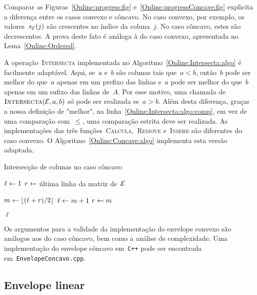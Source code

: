 Comparar as Figuras~\ref{Online:progress:fig} e~\ref{Online:progressConcave:fig} explicita a diferença entre os casos convexo e côncavo. No caso convexo, por exemplo, os valores~$s_{\mathcal{E}}(j)$ são crescentes no índice da coluna~$j$. No caso côncavo, estes são decrescentes. A prova deste fato é análoga à do caso convexo, apresentada no Lema~\ref{Online:Ordered}.

A operação~\textsc{Intersecta} implementada no Algoritmo~\ref{Online:Intersecta:algo} é facilmente adaptável. Aqui, se~$a$ e~$b$ são colunas tais que~$a < b$, então~$b$ pode ser melhor do que~$a$ apenas em um prefixo das linhas e~$a$ pode ser melhor do que~$b$ apenas em um sufixo das linhas de~$A$. Por esse motivo, uma chamada de~$\textsc{Intersecta}(\mathcal{E},a,b)$ só pode ser realizada se~$a > b$. Além desta diferença, graças a nossa definição de "melhor", na linha~\ref{Online:Intersecta:algo:comp}, em vez de uma comparação com~$\leq$, uma comparação estrita deve ser realizada. As implementações das três funções~\textsc{Calcula},~\textsc{Remove} e~\textsc{Insere} são diferentes do caso convexo. O Algoritmo~\ref{Online:Concave:algo} implementa esta versão adaptada.

\begin{algorithm}[h]
\caption{Intersecção de colunas no caso côncavo}
\label{Online:Intersecta:algo}
\begin{algorithmic}[1]
 
    \State $\ell \leftarrow 1$
    \State $r \leftarrow $ última linha da matriz de~$\mathcal{E}$

        \State $m \leftarrow \lfloor(\ell+r)/2\rfloor$
         \label{Online:Intersecta:algo:comp} 
            \State $\ell \leftarrow m + 1$
        \Else
            \State $r \leftarrow m$
        \EndIf
    \EndWhile

    \State \Return $\ell$
\EndFunction
\end{algorithmic}
\end{algorithm}

Os argumentos para a validade da implementação do envelope convexo são análogos aos do caso côncavo, bem como a análise de complexidade. Uma implementação do envelope côncavo em~\texttt{C++} pode ser encontrada em~\texttt{EnvelopeConcavo.cpp}.


\subsection{Envelope linear} \label{Online:linear}

